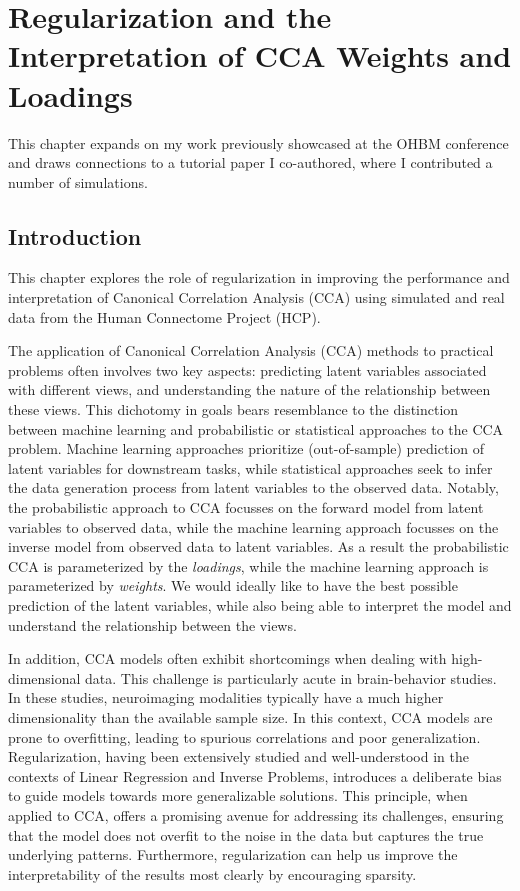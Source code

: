 \chapter{Regularization and the Interpretation of CCA Weights and Loadings}\label{chap:als}
\minitoc
This chapter expands on my work previously showcased at the OHBM conference and draws connections to a tutorial paper I co-authored, where I contributed a number of simulations\citep{mihalik2022canonical}.

\section{Introduction}\label{sec:introduction}

This chapter explores the role of regularization in improving the performance and interpretation of Canonical
Correlation Analysis (CCA) using simulated and real data from the Human Connectome Project (HCP).

The application of Canonical Correlation Analysis (CCA) methods to practical problems often involves two key aspects: predicting latent variables associated with different views, and understanding the nature of the relationship between these views.
This dichotomy in goals bears resemblance to the distinction between machine learning and probabilistic or statistical approaches to the CCA problem.
Machine learning approaches prioritize (out-of-sample) prediction of latent variables for downstream tasks, while statistical approaches seek to infer the data generation process from latent variables to the observed data.
Notably, the probabilistic approach to CCA focusses on the forward model from latent variables to observed data, while the machine learning approach focusses on the inverse model from observed data to latent variables.
As a result the probabilistic CCA is parameterized by the \textit{loadings}, while the machine learning approach is parameterized by \textit{weights}.
We would ideally like to have the best possible prediction of the latent variables, while also being able to interpret the model and understand the relationship between the views.

In addition, CCA models often exhibit shortcomings when dealing with high-dimensional data.
This challenge is particularly acute in brain-behavior studies.
In these studies, neuroimaging modalities typically have a much higher dimensionality than the available sample size.
In this context, CCA models are prone to overfitting, leading to spurious correlations and poor generalization.
Regularization, having been extensively studied and well-understood in the contexts of Linear Regression and Inverse Problems, introduces a deliberate bias to guide models towards more generalizable solutions.
This principle, when applied to CCA, offers a promising avenue for addressing its challenges, ensuring that the model does not overfit to the noise in the data but captures the true underlying patterns.
Furthermore, regularization can help us improve the interpretability of the results most clearly by encouraging sparsity.


